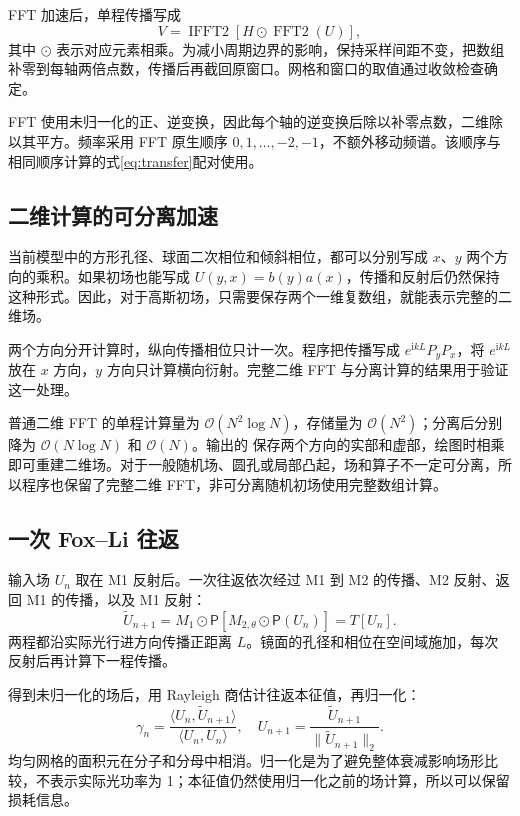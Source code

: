 \documentclass[UTF8,a4paper,11pt,fontset=fandol]{ctexart}
\newcommand{\ii}{\mathrm{i}}
\begin{document}
FFT 加速后，单程传播写成
\begin{equation}
 V=\operatorname{IFFT2}\left[H\odot\operatorname{FFT2}(U)\right],
\end{equation}
其中 $\odot$ 表示对应元素相乘。为减小周期边界的影响，保持采样间距不变，把数组补零到每轴两倍点数，传播后再截回原窗口。网格和窗口的取值通过收敛检查确定。

FFT 使用未归一化的正、逆变换，因此每个轴的逆变换后除以补零点数，二维除以其平方。频率采用 FFT 原生顺序 $0,1,\ldots,-2,-1$，不额外移动频谱。该顺序与相同顺序计算的式\eqref{eq:transfer}配对使用。

\subsection{二维计算的可分离加速}
当前模型中的方形孔径、球面二次相位和倾斜相位，都可以分别写成 $x$、$y$ 两个方向的乘积。如果初场也能写成 $U(y,x)=b(y)a(x)$，传播和反射后仍然保持这种形式。因此，对于高斯初场，只需要保存两个一维复数组，就能表示完整的二维场。

两个方向分开计算时，纵向传播相位只计一次。程序把传播写成 $e^{\ii kL}P_yP_x$，将 $e^{\ii kL}$ 放在 $x$ 方向，$y$ 方向只计算横向衍射。完整二维 FFT 与分离计算的结果用于验证这一处理。

普通二维 FFT 的单程计算量为 $\mathcal O(N^2\log N)$，存储量为 $\mathcal O(N^2)$；分离后分别降为 $\mathcal O(N\log N)$ 和 $\mathcal O(N)$。输出的  保存两个方向的实部和虚部，绘图时相乘即可重建二维场。对于一般随机场、圆孔或局部凸起，场和算子不一定可分离，所以程序也保留了完整二维 FFT，非可分离随机初场使用完整数组计算。

\subsection{一次 Fox--Li 往返}
输入场 $U_n$ 取在 M1 反射后。一次往返依次经过 M1 到 M2 的传播、M2 反射、返回 M1 的传播，以及 M1 反射：
\begin{equation}
 \widetilde U_{n+1}=M_1\odot\mathsf P
 \left[M_{2,\theta}\odot\mathsf P(U_n)\right]=T[U_n].
\end{equation}
两程都沿实际光行进方向传播正距离 $L$。镜面的孔径和相位在空间域施加，每次反射后再计算下一程传播。

得到未归一化的场后，用 Rayleigh 商估计往返本征值，再归一化：
\begin{equation}
 \gamma_n=\frac{\langle U_n,\widetilde U_{n+1}\rangle}{\langle U_n,U_n\rangle},\quad
 U_{n+1}=\frac{\widetilde U_{n+1}}{\|\widetilde U_{n+1}\|_2}.
\end{equation}
均匀网格的面积元在分子和分母中相消。归一化是为了避免整体衰减影响场形比较，不表示实际光功率为 1；本征值仍然使用归一化之前的场计算，所以可以保留损耗信息。
\end{document}
